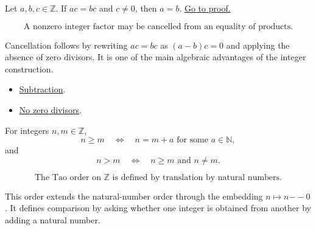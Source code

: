 \begin{corollary}
\label{cor:int-cancel}
Let \(a,b,c\in\mathbb{Z}\). If \(ac=bc\) and \(c\neq 0\), then \(a=b\).
\hyperref[prf:int-cancel]{Go to proof.}
\end{corollary}

\begin{remark*}
\[
  \text{A nonzero integer factor may be cancelled from an equality of products.}
\]
\end{remark*}

\begin{remark*}[Interpretation]
Cancellation follows by rewriting \(ac=bc\) as \((a-b)c=0\) and applying the
absence of zero divisors. It is one of the main algebraic advantages of the
integer construction.
\end{remark*}

\begin{dependencies}
\begin{itemize}
  \item \hyperref[def:int-subtraction]{Subtraction}.
  \item \hyperref[prop:int-no-zero-div]{No zero divisors}.
\end{itemize}
\end{dependencies}

\begin{definition}
\label{def:tao-order-on-z}
For integers \(n,m\in\mathbb{Z}\),
\[
  n\geq m \quad\Longleftrightarrow\quad n=m+a
  \text{ for some } a\in\mathbb{N},
\]
and
\[
  n>m \quad\Longleftrightarrow\quad n\geq m \text{ and } n\neq m.
\]
\end{definition}


\begin{remark*}
\[
  \text{The Tao order on } \mathbb{Z}
  \text{ is defined by translation by natural numbers.}
\]
\end{remark*}

\begin{remark*}[Interpretation]
This order extends the natural-number order through the embedding
\(n\mapsto n {-\!\!-} 0\). It defines comparison by asking whether one
integer is obtained from another by adding a natural number.
\end{remark*}

